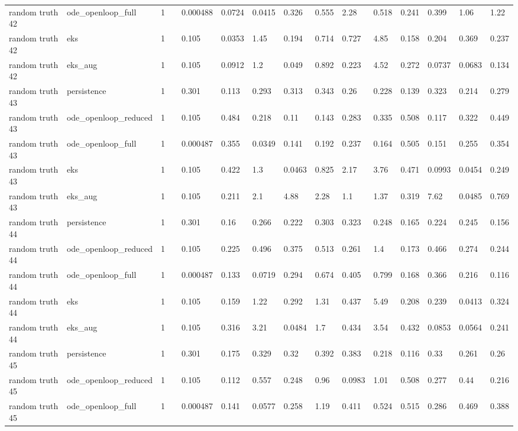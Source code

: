 \begin{table}[t]
\begin{tabular}{lllllllllllllll}
random truth 42 & ode\_openloop\_full & 1 &  & 0.000488 & 0.0724 & 0.0415 & 0.326 & 0.555 & 2.28 & 0.518 & 0.241 & 0.399 & 1.06 & 1.22 \\
random truth 42 & eks & 1 &  & 0.105 & 0.0353 & 1.45 & 0.194 & 0.714 & 0.727 & 4.85 & 0.158 & 0.204 & 0.369 & 0.237 \\
random truth 42 & eks\_aug & 1 &  & 0.105 & 0.0912 & 1.2 & 0.049 & 0.892 & 0.223 & 4.52 & 0.272 & 0.0737 & 0.0683 & 0.134 \\
random truth 43 & persistence & 1 &  & 0.301 & 0.113 & 0.293 & 0.313 & 0.343 & 0.26 & 0.228 & 0.139 & 0.323 & 0.214 & 0.279 \\
random truth 43 & ode\_openloop\_reduced & 1 &  & 0.105 & 0.484 & 0.218 & 0.11 & 0.143 & 0.283 & 0.335 & 0.508 & 0.117 & 0.322 & 0.449 \\
random truth 43 & ode\_openloop\_full & 1 &  & 0.000487 & 0.355 & 0.0349 & 0.141 & 0.192 & 0.237 & 0.164 & 0.505 & 0.151 & 0.255 & 0.354 \\
random truth 43 & eks & 1 &  & 0.105 & 0.422 & 1.3 & 0.0463 & 0.825 & 2.17 & 3.76 & 0.471 & 0.0993 & 0.0454 & 0.249 \\
random truth 43 & eks\_aug & 1 &  & 0.105 & 0.211 & 2.1 & 4.88 & 2.28 & 1.1 & 1.37 & 0.319 & 7.62 & 0.0485 & 0.769 \\
random truth 44 & persistence & 1 &  & 0.301 & 0.16 & 0.266 & 0.222 & 0.303 & 0.323 & 0.248 & 0.165 & 0.224 & 0.245 & 0.156 \\
random truth 44 & ode\_openloop\_reduced & 1 &  & 0.105 & 0.225 & 0.496 & 0.375 & 0.513 & 0.261 & 1.4 & 0.173 & 0.466 & 0.274 & 0.244 \\
random truth 44 & ode\_openloop\_full & 1 &  & 0.000487 & 0.133 & 0.0719 & 0.294 & 0.674 & 0.405 & 0.799 & 0.168 & 0.366 & 0.216 & 0.116 \\
random truth 44 & eks & 1 &  & 0.105 & 0.159 & 1.22 & 0.292 & 1.31 & 0.437 & 5.49 & 0.208 & 0.239 & 0.0413 & 0.324 \\
random truth 44 & eks\_aug & 1 &  & 0.105 & 0.316 & 3.21 & 0.0484 & 1.7 & 0.434 & 3.54 & 0.432 & 0.0853 & 0.0564 & 0.241 \\
random truth 45 & persistence & 1 &  & 0.301 & 0.175 & 0.329 & 0.32 & 0.392 & 0.383 & 0.218 & 0.116 & 0.33 & 0.261 & 0.26 \\
random truth 45 & ode\_openloop\_reduced & 1 &  & 0.105 & 0.112 & 0.557 & 0.248 & 0.96 & 0.0983 & 1.01 & 0.508 & 0.277 & 0.44 & 0.216 \\
random truth 45 & ode\_openloop\_full & 1 &  & 0.000487 & 0.141 & 0.0577 & 0.258 & 1.19 & 0.411 & 0.524 & 0.515 & 0.286 & 0.469 & 0.388 \\

\end{tabular}
\end{table}
